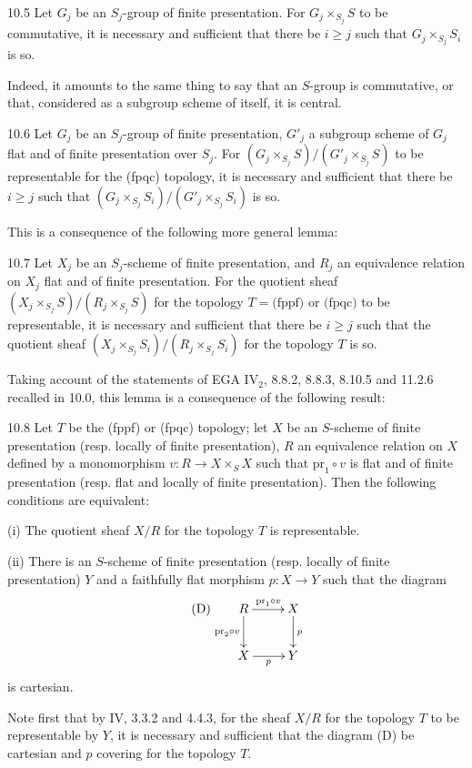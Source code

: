 \begin{corollary}{10.5}\label{VIB.10.5}
Let $G_j$ be an $S_j$-group of finite presentation. For $G_j\times_{S_j}S$ to be commutative, it is necessary and sufficient that there be $i\geq j$ such that $G_j\times_{S_j}S_i$ is so.
\end{corollary}
Indeed, it amounts to the same thing to say that an $S$-group is commutative, or that, considered as a subgroup scheme of itself, it is central.

\begin{proposition}{10.6}\label{VIB.10.6}
Let $G_j$ be an $S_j$-group of finite presentation, $G'_j$ a subgroup scheme of $G_j$ flat and of finite presentation over $S_j$. For $(G_j\times_{S_j}S)/(G'_j\times_{S_j}S)$ to be representable for the (fpqc) topology, it is necessary and sufficient that there be $i\geq j$ such that $(G_j\times_{S_j}S_i)/(G'_j\times_{S_j}S_i)$ is so.
\end{proposition}
This is a consequence of the following more general lemma:

\begin{lemma}{10.7}\label{VIB.10.7}
Let $X_j$ be an $S_j$-scheme of finite presentation, and $R_j$ an equivalence relation on $X_j$ flat and of finite presentation. For the quotient sheaf $(X_j\times_{S_j}S)/(R_j\times_{S_j}S)$ for the topology $T=\text{(fppf)}$ or $\text{(fpqc)}$ to be representable, it is necessary and sufficient that there be $i\geq j$ such that the quotient sheaf $(X_j\times_{S_j}S_i)/(R_j\times_{S_j}S_i)$ for the topology $T$ is so.
\end{lemma}
Taking account of the statements of EGA IV$_2$, 8.8.2, 8.8.3, 8.10.5 and 11.2.6 recalled in 10.0, this lemma is a consequence of the following result:

\begin{lemma}{10.8}\label{VIB.10.8}
Let $T$ be the (fppf) or (fpqc) topology; let $X$ be an $S$-scheme of finite presentation (resp. locally of finite presentation), $R$ an equivalence relation on $X$ defined by a monomorphism $v:R\to X\times_S X$ such that $\mathrm{pr}_1\circ v$ is flat and of finite presentation (resp. flat and locally of finite presentation). Then the following conditions are equivalent:

(i) The quotient sheaf $X/R$ for the topology $T$ is representable.

(ii) There is an $S$-scheme of finite presentation (resp. locally of finite presentation) $Y$ and a faithfully flat morphism $p:X\to Y$ such that the diagram
\begin{equation*}\tag{D}
\xymatrix{R\ar[r]^{\mathrm{pr}_1\circ v}\ar[d]_{\mathrm{pr}_2\circ v}&X\ar[d]^p\\X\ar[r]_p&Y}
\end{equation*}
is cartesian.
\end{lemma}
Note first that by IV, 3.3.2 and 4.4.3, for the sheaf $X/R$ for the topology $T$ to be representable by $Y$, it is necessary and sufficient that the diagram (D) be cartesian and $p$ covering for the topology $T$.

